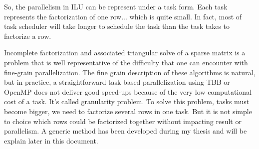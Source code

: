 So, the parallelism in ILU can be represent under a task form.
%
Each task represents the factorization of one row... which is quite small.
%
In fact, most of task scheduler will take longer to schedule the task than the task takes to factorize a row.



Incomplete factorization and associated triangular solve of a sparse matrix is a problem that is well representative of the difficulty that one can encounter with fine-grain parallelization.
%
The fine grain description of these algorithms is natural, but in practice, a straightforward task based parallelization using TBB or
OpenMP does not deliver good speed-ups because of the very low computational cost of a task.
%
It's called granularity problem.
%
To solve this problem, tasks must become bigger, we need to factorize several rows in one task.
%
But it is not simple to choice which rows could be factorized together without impacting result or parallelism.
%
A generic method has been developed during my thesis and will be explain later in this document.
